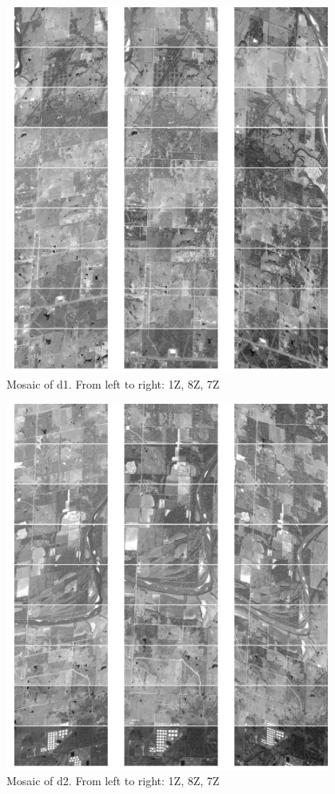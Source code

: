 \documentclass[paper=a4, fontsize=11pt, onecolumn, tikz, dvipsnames, svgnames, x11names]{article}
\begin{document}
\begin{figure}[H]
    \centering
    \includegraphics[width = 0.95\textwidth]{d1.png}
    \caption{Mosaic of d1. From left to right: 1Z, 8Z, 7Z}
    \label{fig_mosaic_d1}
\end{figure}

\newpage
\begin{figure}[H]
    \centering
    \includegraphics[width = 0.95\textwidth]{d2.png}
    \caption{Mosaic of d2. From left to right: 1Z, 8Z, 7Z}
    \label{fig_mosaic_d2}
\end{figure}
\end{document}
